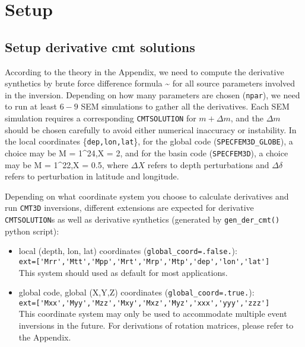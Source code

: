 \documentclass[12pt,titlepage,fleqn]{article}
\begin{document}
\section{Setup}

\subsection{Setup derivative cmt solutions}
According to the theory in the Appendix, we need to compute the derivative synthetics by brute force difference formula
\eq {} \sim {} \en
for all source parameters involved in the inversion. Depending on how many parameters are chosen (\verb+npar+), we need to run at least $6-9$ SEM simulations to gather all the derivatives. Each SEM simulation requires a corresponding \verb+CMTSOLUTION+ for $m+\Delta m$, and the $\Delta m$ should be chosen carefully to avoid either numerical inaccuracy or instability. In the local coordinates  \{\verb+dep,lon,lat+\}, for the global code (\verb+SPECFEM3D_GLOBE+), a choice may be
\eq
\Delta M = 1^{24},\quad \Delta X = 2, \quad \Delta{} 
\en
and for the basin code (\verb+SPECFEM3D+), a choice may be
\eq
\Delta M = 1^{22},\quad \Delta X = 0.5, \quad \Delta{}
\en
where $\Delta X$ refers to depth perturbations and $\Delta \delta$ refers to perturbation in latitude and longitude.

Depending on what coordinate system you choose to calculate derivatives and run \verb+CMT3D+ inversions, different extensions are expected for derivative \verb+CMTSOLUTION+s as well as derivative synthetics (generated by \verb+gen_der_cmt()+ python script):
\begin{itemize}
\item local (depth, lon, lat) coordinates (\verb+global_coord=.false.+):\\
   \verb+ext=['Mrr','Mtt','Mpp','Mrt','Mrp','Mtp','dep','lon','lat']+\\
This system should used as default for most applications.

\item global code, global (X,Y,Z) coordinates (\verb+global_coord=.true.+):\\
   \verb+ext=['Mxx','Myy','Mzz','Mxy','Mxz','Myz','xxx','yyy','zzz']+\\
This coordinate system may only be used to accommodate multiple event inversions in the future. For derivations of rotation matrices, please refer to the Appendix.

\end{itemize}
\end{document}
